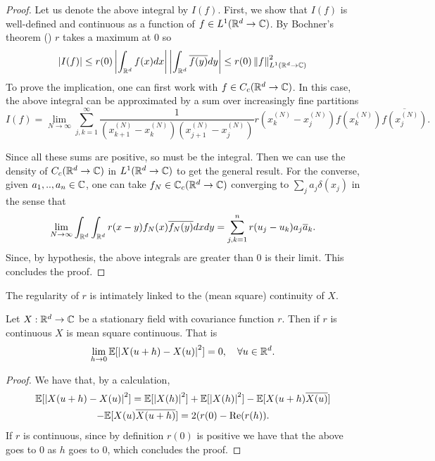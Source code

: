 \documentclass[
    a4paper,
    DIV=14,
    abstract=true,
    numbers=noenddot
]{scrartcl}
\begin{document}
\begin{proof}
	Let us denote the above integral by $I(f)$. First, we show that $I(f)$ is well-defined and continuous as a function of $f \in L^1(\mathbb{R}^d\to\mathbb{C})$. By Bochner's theorem () $r$ takes a maximum at  $0$ so
	\begin{equation*}
		\left| I(f) \right|\leq r(0)\left| \int_{\mathbb{R}^d}f(x)dx \right|\left| \int_{\mathbb{R}^d}\overline{f(y)}dy \right|\leq r(0)\left\lVert f \right\rVert_{L^1(\mathbb{R}^d\to \mathbb{C})}^2
	\end{equation*}
	To prove the implication, one can first work with  $f\in C_c(\mathbb{R}^d\to\mathbb{C})$. In this case, the above integral can be approximated by a sum over increasingly fine partitions
	\begin{equation*}
		I(f)=\lim_{N\to\infty}\sum_{j,k=1}^\infty\frac{1}{(x_{k+1}^{(N)}-x_k^{(N)})(x_{j+1}^{(N)}-x_j^{(N)})} r(x^{(N)}_k-x^{(N)}_j)f(x^{(N)}_k)\overline{f(x^{(N)}_j)}.
	\end{equation*}

	Since all these sums are positive, so must be the integral. Then we can use the density of $C_c(\mathbb{R}^d\to\mathbb{C})$ in $L^1(\mathbb{R}^d\to\mathbb{C})$ to get the general result. For the converse, given $a_1,..,a_n\in \mathbb{C}$, one can take $f_N\in\mathbb{C}_c(\mathbb{R}^d\to \mathbb{C})$ converging to  $\sum_{j}a_j \delta(x_j)$ in the sense that
	\begin{equation*}
		\lim_{N\to\infty}\int_{\mathbb{R}^d}\int_{\mathbb{R}^d} r(x-y)f_N(x)\overline{f_N(y)}dx dy=
		\sum_{j,k=1}^{n} r(u_j-u_k)a_j\overline{a}_k.
	\end{equation*}
	Since, by hypothesis, the above integrals are greater than $0$ is their limit. This concludes the proof.
\end{proof}
The regularity of $r$ is intimately linked to the (mean square) continuity of $X$.
\begin{lemma}
	Let  $X:\mathbb{R}^d\to\mathbb{C} $ be a stationary field with covariance function $r$. Then if $r$ is continuous $X$ is mean square continuous. That is
	\begin{equation*}
		\lim_{h\to 0}\mathbb{E}[\left| {X(u+h)-X(u)} \right|^2]=0,\quad\forall u\in\mathbb{R}^d.
	\end{equation*}
\end{lemma}
\begin{proof}
	We have that, by a calculation,
	\begin{multline*}
		\mathbb{E}[\left| {X(u+h)-X(u)} \right|^2]=\mathbb{E}[\left| X(h) \right|^2]+\mathbb{E}[\left| X(h) \right|^2]-\mathbb{E}[X(u+h)\overline{X(u)}]\\-\mathbb{E}[X(u)\overline{X(u+h)}]=2(r(0)-\Re(r(h)).
	\end{multline*}
	If $r$ is continuous, since by definition $r(0)$ is positive we have that the above goes to $0$ as $h$ goes to $0$, which concludes the proof.
\end{proof}
\end{document}
